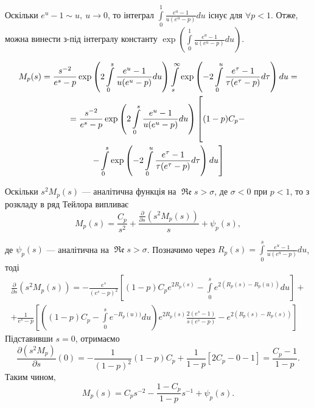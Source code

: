 Оскільки $e^u - 1 \sim u,~u \rightarrow 0$, то інтеграл $\int\limits_{0}^{1} \frac{e^u -1}{u(e^u - p)} du$ існує для $\forall p < 1$. Отже, можна винести з-під інтегралу константу $\exp\left(\int\limits_{0}^{1} \frac{e^u -1}{u(e^u - p)} du\right)$.

\begin{gather*}
M_{p}(s) = \frac{s^{-2}}{e^s-p} \exp \left(2 \int\limits_{0}^{s} \frac{e^u -1}{u(e^u - p)} du\right) \int\limits_s^\infty \exp\left(-2 \int\limits_{0}^{u} \frac{e^\tau -1}{\tau(e^\tau - p)} d\tau\right) du = \\
=\frac{s^{-2}}{e^s-p} \exp \left(2 \int\limits_{0}^{s} \frac{e^u -1}{u(e^u - p)} du\right) \left[\rule{0cm}{1.05cm} (1-p) C_{p} - \right. \\
\left.- \int\limits_0^s \exp\left(-2 \int\limits_{0}^{u} \frac{e^\tau -1}{\tau(e^\tau - p)} d\tau\right) du \right]
\end{gather*}

Оскільки $s^2 M_{p}(s)$ --- аналітична функція на $\operatorname{\mathfrak{Re}} s > \sigma$, де $\sigma < 0$ при $p < 1$, то з розкладу в ряд Тейлора випливає
\begin{equation}
M_{p}(s) = \frac{C_{p}}{s^2} + \frac{\frac{\partial}{\partial s}(s^2 M_{p}(s))}{s} + \psi_{p}(s),
\end{equation}

де $\psi_{p}(s)$ --- аналітична на $\operatorname{\mathfrak{Re}} s > \sigma$. Позначимо через $R_{p}(s)=\int\limits_{0}^{s} \frac{e^u -1}{u(e^u - p)} du$, тоді
\begin{gather*}
\frac{\partial}{\partial s}(s^2 M_{p}(s)) = -\frac{e^s}{(e^s - p)^2} \left[(1-p) C_{p} e^{2 R_{p}(s)} - \int\limits_{0}^{s} e^{2(R_{p}(s) - R_{p}(u))} du\right] + \\
+ \frac{1}{e^s - p} \left[ \left((1 - p) C_{p} - \int\limits_{0}^{s} e^{- R_{p}(u))} du\right) e^{2R_{p}(s)} \frac{2(e^s - 1)}{s(e^s - p)} - e^{2(R_{p}(s) - R_{p}(s))} \right] 
\end{gather*}
Підставивши $s = 0$, отримаємо
\begin{equation*}
\frac{\partial (s^2 M_{p})}{\partial s}(0) = -\frac{1}{(1-p)^2} (1-p) C_{p} + \frac{1}{1-p} \left[ 2 C_{p} - 0 - 1 \right] = \frac{C_{p} - 1}{1 - p}.
\end{equation*}
Таким чином,
\begin{equation}
\label{eq:model_laplace_taylor}
M_{p}(s) = C_{p} s^{-2} - \frac{1 - C_{p}}{1 - p} s^{-1} + \psi_{p}(s).
\end{equation}

